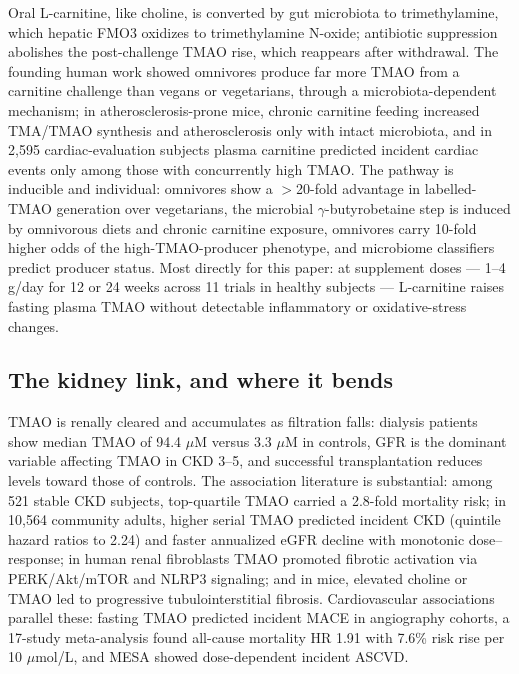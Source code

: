 Oral L-carnitine, like choline, is converted by gut microbiota to trimethylamine, which hepatic FMO3 oxidizes to trimethylamine N-oxide; antibiotic suppression abolishes the post-challenge TMAO rise, which reappears after withdrawal. The founding human work showed omnivores produce far more TMAO from a carnitine challenge than vegans or vegetarians, through a microbiota-dependent mechanism; in atherosclerosis-prone mice, chronic carnitine feeding increased TMA/TMAO synthesis and atherosclerosis only with intact microbiota, and in 2{,}595 cardiac-evaluation subjects plasma carnitine predicted incident cardiac events only among those with concurrently high TMAO. The pathway is inducible and individual: omnivores show a $>$20-fold advantage in labelled-TMAO generation over vegetarians, the microbial $\gamma$-butyrobetaine step is induced by omnivorous diets and chronic carnitine exposure, omnivores carry 10-fold higher odds of the high-TMAO-producer phenotype, and microbiome classifiers predict producer status. Most directly for this paper: at supplement doses --- 1--4 g/day for 12 or 24 weeks across 11 trials in healthy subjects --- L-carnitine raises fasting plasma TMAO without detectable inflammatory or oxidative-stress changes.

\subsection{The kidney link, and where it bends}

TMAO is renally cleared and accumulates as filtration falls: dialysis patients show median TMAO of 94.4 $\mu$M versus 3.3 $\mu$M in controls, GFR is the dominant variable affecting TMAO in CKD 3--5, and successful transplantation reduces levels toward those of controls. The association literature is substantial: among 521 stable CKD subjects, top-quartile TMAO carried a 2.8-fold mortality risk; in 10{,}564 community adults, higher serial TMAO predicted incident CKD (quintile hazard ratios to 2.24) and faster annualized eGFR decline with monotonic dose--response; in human renal fibroblasts TMAO promoted fibrotic activation via PERK/Akt/mTOR and NLRP3 signaling; and in mice, elevated choline or TMAO led to progressive tubulointerstitial fibrosis. Cardiovascular associations parallel these: fasting TMAO predicted incident MACE in angiography cohorts, a 17-study meta-analysis found all-cause mortality HR 1.91 with 7.6\% risk rise per 10 $\mu$mol/L, and MESA showed dose-dependent incident ASCVD.

